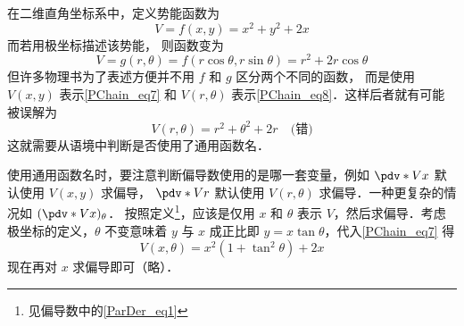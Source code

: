 \begin{example}{}\label{PChain_ex1}
在二维直角坐标系中，定义势能函数为
\begin{equation}\label{PChain_eq7}
V=f(x,y)=x^2+y^2+2x
\end{equation}
而若用极坐标描述该势能， 则函数变为
\begin{equation}\label{PChain_eq8}
V = g(r,\theta) = f(r\cos \theta , r\sin \theta ) = r^2 + 2r\cos \theta
\end{equation}
但许多物理书为了表述方便并不用 $f$ 和 $g$ 区分两个不同的函数， 而是使用 $V(x,y)$ 表示\autoref{PChain_eq7} 和 $V(r,\theta)$ 表示\autoref{PChain_eq8}．这样后者就有可能被误解为
\begin{equation}
V(r,\theta) = r^2+\theta^2+2r \quad \text{(错)}
\end{equation}
这就需要从语境中判断是否使用了通用函数名．

使用通用函数名时，要注意判断偏导数使用的是哪一套变量，例如 $\pdv*{V}{x}$ 默认使用 $V(x,y)$ 求偏导， $\pdv*{V}{r}$ 默认使用 $V(r,\theta)$ 求偏导．一种更复杂的情况如 $(\pdv*{V}{x})_\theta$． 按照定义\footnote{见偏导数中的\autoref{ParDer_eq1}}，应该是仅用 $x$ 和 $\theta$ 表示 $V$，然后求偏导．考虑极坐标的定义，$\theta$ 不变意味着 $y$ 与 $x$ 成正比即 $y=x\tan\theta$，代入\autoref{PChain_eq7} 得
\begin{equation}
V(x,\theta)=x^2(1+\tan^2 \theta) + 2x
\end{equation}
现在再对 $x$ 求偏导即可（略）．
\end{example}
